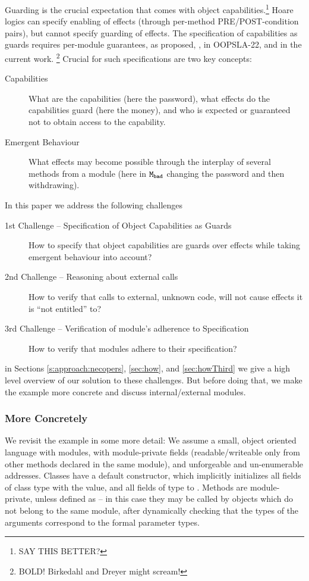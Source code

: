 {Guarding is the crucial expectation that comes with object capabilities.\footnote{SAY THIS BETTER?} 
Hoare logics can specify enabling of effects (through per-method PRE/POST-condition pairs), but cannot specify guarding of effects.
The specification of capabilities as guards 
requires per-module guarantees, as proposed, \eg,  in OOPSLA-22, and in the current work.
\footnote{BOLD! Birkedahl and Dreyer might scream!}
%
\noindent
Crucial for such specifications are  two key concepts:
\begin{description}
\item[Capabilities] What are the capabilities (here the password), what effects do the capabilities {guard} (here the money), 
and who is expected or guaranteed not to obtain access to the capability.
\item[Emergent Behaviour] What effects may become possible through the interplay of several methods from a module  (here in ${{\texttt{M}}_{{\texttt{bad}}}}$  
{changing the password and then withdrawing}).
\end{description}}

\noindent
In this paper we address the following challenges
\begin{description}
\item[1st Challenge -- Specification of Object Capabilities as Guards] How to specify that object capabilities are guards over effects while taking emergent behaviour into account?
\item[2nd Challenge -- Reasoning about external calls] How to verify that calls to external, unknown code, will not cause effects it is   ``not entitled'' to?
\item[3rd Challenge -- Verification of module's adherence to Specification] How to verify that modules adhere to their specification?
\end{description}


\noindent in Sections \ref{s:approach:necopers}, \ref{sec:how}, and \ref{sec:howThird} we give a high level overview of our solution to these challenges.
But before doing that, we make the example more concrete and discuss internal/external modules.

 \subsubsection{More Concretely}
We revisit the example in some more detail:
We assume a  small, object oriented language with modules, with module-private fields
(readable/writeable only from other methods declared in the same module),  
and unforgeable and un-enumerable addresses.
Classes have a default constructor, which implicitly initializes all fields {of class type}  with the  value,
{and all fields of  type to }.
{Methods are module-private, unless defined as  -- in this case they may be called by objects which do not belong to the same module, after dynamically checking that the types of the arguments correspond to the formal parameter types.}
   


